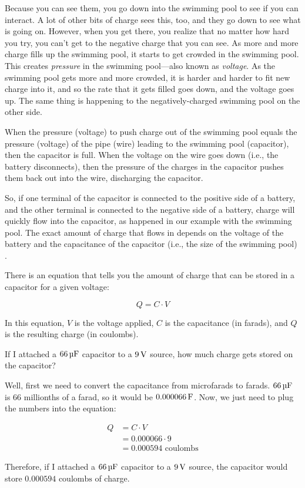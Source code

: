 Because you can see them, you go down into the swimming pool to see if you can interact.
A lot of other bits of charge sees this, too, and they go down to see what is going on.
However, when you get there, you realize that no matter how hard you try, you can't get to the negative charge that you can see.
As more and more charge fills up the swimming pool, it starts to get crowded in the swimming pool.
This creates \emph{pressure} in the swimming pool---also known as \emph{voltage}.
As the swimming pool gets more and more crowded, it is harder and harder to fit new charge into it, and so the rate that it gets filled goes down, and the voltage goes up.
The same thing is happening to the negatively-charged swimming pool on the other side.

When the pressure (voltage) to push charge out of the swimming pool equals the pressure (voltage) of the pipe (wire) leading to the swimming pool (capacitor), then the capacitor is full.
When the voltage on the wire goes down (i.e., the battery disconnects), then the pressure of the charges in the capacitor pushes them back out into the wire, discharging the capacitor.


So, if one terminal of the capacitor is connected to the positive side of a battery, and the other terminal is connected to the negative side of a battery, charge will quickly flow into the capacitor, as happened in our example with the swimming pool.
The exact amount of charge that flows in depends on the voltage of the battery and the capacitance of the capacitor (i.e., the size of the swimming pool)
.

There is an equation that tells you the amount of charge that can be stored in a capacitor for a given voltage:

\begin{equation}
\label{eqBasicCapacitance}
Q = C\cdot V
\end{equation}

In this equation, $V$ is the voltage applied, $C$ is the capacitance (in farads), and $Q$ is the resulting charge (in coulombs).

\begin{exampleprob}
If I attached a $66\,\si{\micro\farad}$ capacitor to a $9\,\si{\volt}$ source, how much charge gets stored on the capacitor?

Well, first we need to convert the capacitance from microfarads to farads.  
$66\,\si{\micro\farad}$ is 66 millionths of a farad, so it would be $0.000066\,\si{\farad}$.
Now, we just need to plug the numbers into the equation:

\begin{align*}
Q &= C\cdot V \\
  &= 0.000066\cdot 9 \\
  &= 0.000594 \textrm{ coulombs}
\end{align*}

Therefore, if I attached a $66\,\si{\micro\farad}$ capacitor to a $9\,\si{\volt}$ source, the capacitor would store $0.000594 \textrm{ coulombs}$ of charge.
\end{exampleprob}

